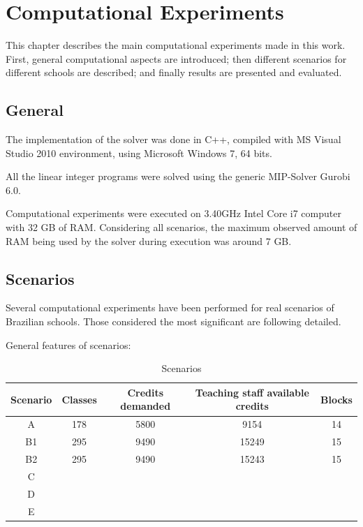 \chapter{Computational Experiments}
\label{chap:experiments}


This chapter describes the main computational experiments made in this work. First, general computational aspects are introduced; then different scenarios for different schools are described; and finally results are presented and evaluated.


\section{General}

The implementation of the solver was done in C++, compiled with MS Visual Studio 2010 environment, using Microsoft Windows 7, 64 bits.

All the linear integer programs were solved using the generic MIP-Solver Gurobi 6.0. 

Computational experiments were executed on 3.40GHz Intel Core i7 computer with 32 GB of RAM. Considering all scenarios, the maximum observed amount of RAM being used by the solver during execution was around 7 GB.


\section{Scenarios}

Several computational experiments have been performed for real scenarios of Brazilian schools. Those considered the most significant are following detailed.

General features of scenarios:
\begin{table}[ht]
\caption{Scenarios} 							%
\centering
\begin{tabular}{c c c c c} 							%
\hline\hline 											%
Scenario & Classes & Credits demanded & Teaching staff available credits & Blocks \\ [0.5ex] 						%
\hline 														%
A & 178 & 5800 & 9154 & 14 \\
B1 & 295 & 9490 & 15249 & 15 \\
B2 & 295 & 9490 & 15243 & 15 \\
C & & & & \\
D & & & & \\
E & & & & \\ [1ex] 							%
\hline
\end{tabular}
\label{table:scenarios} 					%
\end{table}




